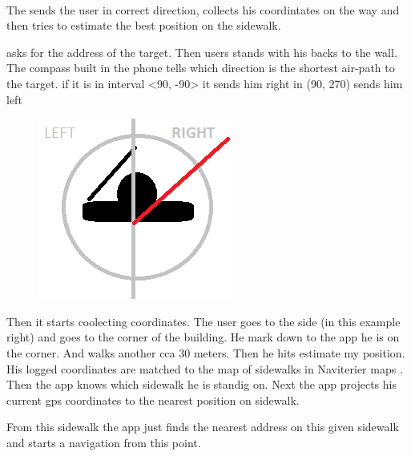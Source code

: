 		
	
	\paragraph{\gps}
	The \gps sends the user in correct direction, collects his coordintates on the way and then tries to estimate the best position on the sidewalk.
	
	\gps asks for the address of the target. Then users stands with his backs to the wall. The compass built in the phone tells which direction is the shortest air-path to the target. if it is in interval <90\degree, -90\degree> it sends him right in (90\degree, 270\degree) sends him left
	
	\begin{figure}
		\centering
		\includegraphics[width=0.7\linewidth]{figures/5thExp-blind2phoneInCity/gps-gorightorgoleft}
		\caption{}
		\label{fig:gps-gorightorgoleft}
	\end{figure}
	
	
	Then it starts coolecting coordinates. The user goes to the side (in this example right) and goes to the corner of the building. He mark down to the app he is on the corner. And walks another cca 30 meters. Then he hits estimate my position. His logged coordinates are matched to the map of sidewalks in Naviterier maps \cite{naviterier-maps}. Then the app knows which sidewalk he is standig on. Next the app projects his current gps coordinates to the nearest position on sidewalk.
	
	From this sidewalk the app just finds the nearest address on this given sidewalk and starts a navigation from this point.
	

